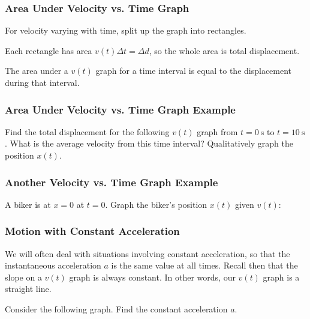 \documentclass[20pt]{beamer}
\begin{document}
\begin{frame}
	\frametitle{Area Under Velocity vs. Time Graph}
	For velocity varying with time, split up the graph into rectangles.
	\begin{figure}[b]
		\centering
		\label{fig:general-vt}
	\end{figure}
	Each rectangle has area $v(t) \Delta t = \Delta d$, so the whole area is total displacement.
	\begin{theorem}
		The area under a $v(t)$ graph for a time interval is equal to the displacement during that interval.
	\end{theorem}
\end{frame}

\begin{frame}
	\frametitle{Area Under Velocity vs. Time Graph Example}
	\begin{example}
		Find the total displacement for the following $v(t)$ graph from $t = \SI{0}{\second}$ to $t = \SI{10}{\second}$. What is the average velocity from this time interval? Qualitatively graph the position $x(t)$.
		\begin{figure}[t]
			\centering
			\label{fig:area-example-vt}
		\end{figure}
	\end{example}
\end{frame}

\begin{frame}
	\frametitle{Another Velocity vs. Time Graph Example}
	\begin{example}
		A biker is at $x = 0$ at $t = 0$. Graph the biker's position $x(t)$ given $v(t)$:
		\begin{figure}[t]
			\centering
			\mplfig{xt-vt.pgf}
			\label{fig:xt-v}
		\end{figure}
	\end{example}
\end{frame}

\begin{frame}
	\frametitle{Motion with Constant Acceleration}
	We will often deal with situations involving constant acceleration, so that the instantaneous acceleration $a$ is the same value at all times. Recall then that the slope on a $v(t)$ graph is always constant. In other words, our $v(t)$ graph is a straight line.
	\begin{example}
		Consider the following graph. Find the constant acceleration $a$.
		\begin{figure}[ht]
			\centering
			\mplfig{constant-a.pgf}
			\label{fig:constant-a}
		\end{figure}
	\end{example}
\end{frame}
\end{document}

